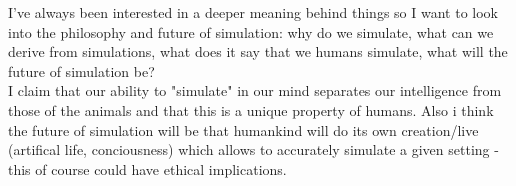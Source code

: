 I've always been interested in a deeper meaning behind things so I want to look into the philosophy and future of simulation: why do we simulate, what can we derive from simulations, what does it say that we humans simulate, what will the future of simulation be? \\
I claim that our ability to "simulate" in our mind separates our intelligence from those of the animals and that this is a unique property of humans. Also i think the future of simulation will be that humankind will do its own creation/live (artifical life, conciousness) which allows to accurately simulate a given setting - this of course could have ethical implications.